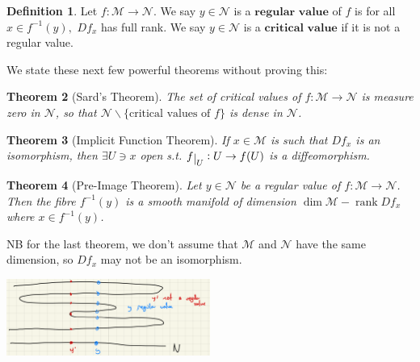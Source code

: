 \documentclass[10pt]{article}
\theoremstyle{plain}
\newtheorem{thm}{Theorem}[section] %
\theoremstyle{definition}
\newtheorem{defn}[thm]{Definition} %
\newcommand{\man}{\mathcal{M}}
\newcommand{\nan}{\mathcal{N}}
\def\restrict#1{\raise-.5ex\hbox{\ensuremath|}_{#1}}
\DeclareMathOperator{\rank}{rank}
\newcommand{\mysection}[1]{
    \setcounter{thm}{0}
    \section*{#1}
    \addcontentsline{toc}{section}{#1}
    \addtocounter{section}{1}
    \setcounter{subsection}{0}

}
\begin{document}
\begin{defn}
Let $f:\man\to\nan$. We say $y\in \nan$ is a $\textbf{regular value}$ of $f$ is for all $x\in f^{-1}(y),$ $Df_x$ has full rank. We say $y\in\nan$ is a $\textbf{critical value}$ if it is not a regular value.
\end{defn}
We state these next few powerful theorems without proving this:
\begin{thm}[Sard's Theorem]
The set of critical values of $f : \man \to \nan$ is measure zero in $\nan$, so that $\nan \backslash \{\text{critical values of } f\}$ is dense in $\nan$.
\end{thm}

\begin{thm}[Implicit Function Theorem]
If $x\in \man$ is such that $Df_x$ is an isomorphism, then $\exists U \ni x$ open s.t. $f\restrict{U} : U \to f(U)$ is a diffeomorphism.
\end{thm}

\begin{thm}[Pre-Image Theorem]
Let $y\in \nan$ be a regular value of $f : \man \to \nan$. Then the fibre $f^{-1}(y)$ is a smooth manifold of dimension $\dim \man - \rank Df_x$ where $x\in f^{-1}(y)$.
\end{thm}
NB for the last theorem, we don't assume that $\man$ and $\nan$ have the same dimension, so $Df_x$ may not be an isomorphism.
\begin{center}
    \includegraphics[width =0.5\textwidth]{Images/RegularValues.png}
\end{center}
\end{document}
